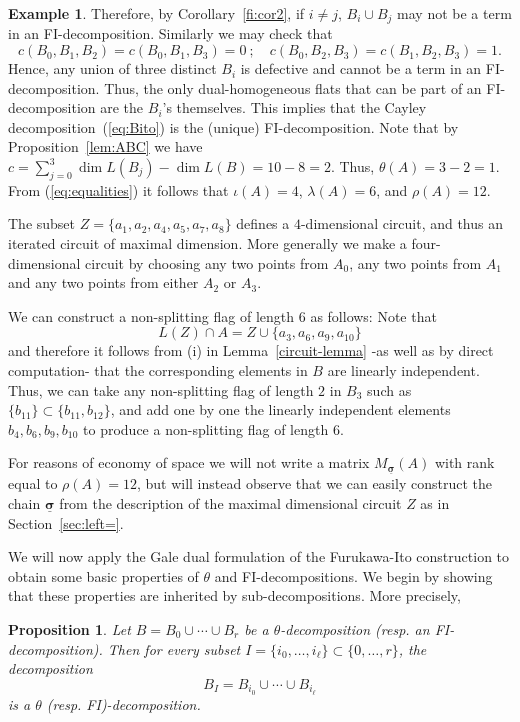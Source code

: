 \documentclass[11pt]{amsart}
\theoremstyle{plain}
\newtheorem{proposition}[theorem]{Proposition}
\theoremstyle{definition}
\newtheorem{example}[theorem]{Example}
\theoremstyle{remark}
\newcommand{\csig}{\ensuremath{\underline{\mathbf \sigma}}}
\numberwithin{equation}{section}
\begin{document}
\begin{example}
Therefore, by Corollary~\ref{fi:cor2}, if
$i\not=j$, $B_i \cup B_j$ may not be a term in an FI-decomposition.   
Similarly we may check that 
$$c(B_0,B_1,B_2) = c(B_0,B_1,B_3) = 0\ ;\quad c(B_0,B_2,B_3) = c(B_1,B_2,B_3)=1.$$
Hence, any union of three distinct $B_i$ is defective and cannot be a term in an FI-decomposition.
Thus, the only dual-homogeneous flats that can be part of an FI-decomposition are the $B_i$'s themselves.
This implies that the Cayley decomposition~(\ref{eq:Bito})
is the (unique)  FI-decomposition. Note that by Proposition~\ref{lem:ABC} we have
$c=\sum_{j=0}^3 \dim L(B_j) - \dim L(B)= 10 -8=2$. Thus, $\theta(A)= 3-2=1$.  From (\ref{eq:equalities}) it follows that 
$\iota(A) = 4$,
$\lambda(A) = 6$,  and $\rho(A) =12$.
 
The subset
 $Z =\{a_1,a_2,a_4,a_5,a_7,a_8\}$
 defines a $4$-dimensional circuit, and thus an iterated circuit of maximal dimension.  
 More generally we make a four-dimensional circuit by 
 choosing any two points from $A_0$, any two points from $A_1$ and any two points from either $A_2$ or $A_3$.  
 
 We can construct a  non-splitting flag of length $6$ as follows:
 Note that $$L(Z) \cap A = Z \cup \{a_3,a_6,a_9,a_{10}\}$$
 and therefore it follows from (i) in Lemma~\ref{circuit-lemma} -as well as by direct computation- that the corresponding elements in $B$ are linearly independent.
 Thus, we can take any non-splitting flag of length $2$ in $B_3$ such as 
 $\{b_{11}\} \subset \{b_{11},b_{12}\} $, 
 and add one by one the linearly independent elements $b_4,b_6,b_9,b_{10}$ to produce a non-splitting flag of length $6$.
 
   For reasons of economy of space we will not write a matrix $M_{\csig}(A)$ with 
 rank equal to $\rho(A)=12$, but will instead observe that we can easily construct the chain 
 $\csig$ from the description of the maximal dimensional circuit $Z$ as in Section~\ref{sec:left=}.
\end{example} 

\medskip



We will now apply the Gale dual formulation of the Furukawa-Ito construction to obtain some basic properties of $\theta$ and FI-decompositions.  
We begin by showing that these properties are inherited by 
sub-decompositions.  More precisely,

\begin{proposition}\label{fi:lemma3}
Let $B =  B_0 \cup \cdots \cup B_r$ be a $\theta$-decomposition (resp. an FI-decomposition).  Then for every subset 
$I = \{i_0,\dots,i_\ell\}  \subset \{0,\dots,r\}$,
the decomposition
$$B_I = B_{i_0}\cup \cdots \cup B_{i_\ell}$$
is a $\theta$ (resp. FI)-decomposition.
\end{proposition}
\end{document}
